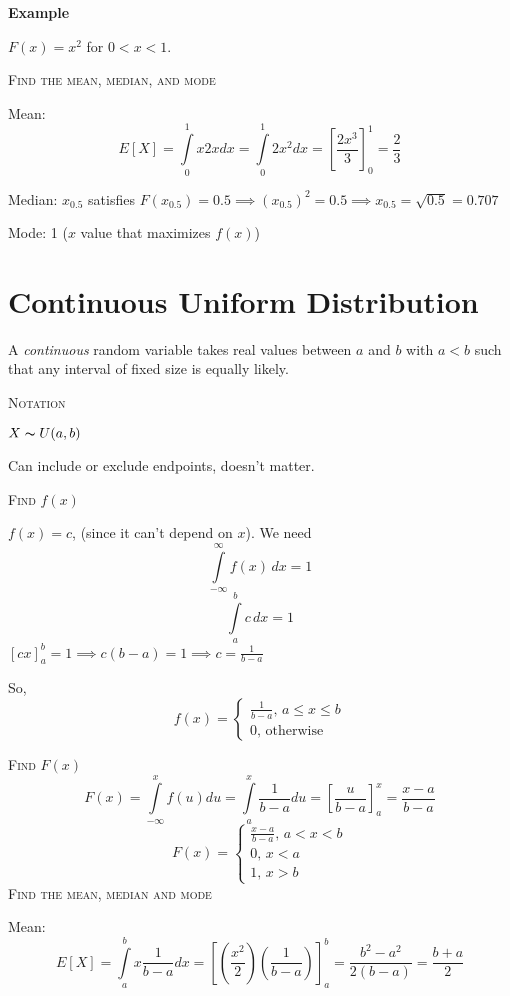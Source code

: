 \textbf{Example}

$ F(x)=x^2 $ for $ 0<x<1 $.

\textsc{Find the mean, median, and mode}

Mean:
\[ E[X]=\int\limits_{0}^{1} x2x d{x} =\int\limits_{0}^{1} 2x^2 d{x}=
    \left[\frac{2x^3}{3}\right]_0^1=\frac{2}{3} \]

Median:
$ x_{0.5} $ satisfies $ F(x_{0.5})=0.5 \implies (x_{0.5})^2=0.5\implies x_{0.5}=
    \sqrt{0.5}=0.707$

Mode: 1 ($ x $ value that maximizes $ f(x) $)

\section{Continuous Uniform Distribution}
A \emph{continuous} random variable takes real values between $ a $ and
$ b $ with $ a<b $ such that any interval of fixed size is equally likely.

\textsc{Notation}

$ X \thicksim U(a,b) $
\begin{remark}
    Can include or exclude endpoints, doesn't matter.
\end{remark}

\textsc{Find $f(x)$}

$ f(x)=c $, (since it can't depend on $ x $). We need
\[ \int\limits_{-\infty}^{\infty} f(x)\,d{x} =1 \]
\[ \int\limits_{a}^{b} c\,d{x} =1 \]
$ \left[cx\right]_a^b=1\implies c(b-a)=1\implies c=\frac{1}{b-a} $

So,
\[ f(x)=\begin{cases}
        \frac{1}{b-a},\, a\le x\le b \\
        0,\, \text{otherwise}
    \end{cases} \]

\textsc{Find $ F(x) $}
\[ F(x)=\int\limits_{-\infty}^{x} f(u) d{u}
    =\int\limits_{a}^{x} \frac{1}{b-a} d{u}
    =\left[\frac{u}{b-a}\right]_a^x=\frac{x-a}{b-a} \]
\[ F(x)=\begin{cases}
        \frac{x-a}{b-a},\, a<x<b \\
        0,\,x<a                  \\
        1,\,x>b
    \end{cases} \]
\textsc{Find the mean, median and mode}

Mean:
\[ E[X]=\int\limits_{a}^{b} x \frac{1}{b-a} d{x}
    =\left[\left(\frac{x^2}{2}\right)\left(\frac{1}{b-a}\right)\right]_a^b
    =\frac{b^2-a^2}{2(b-a)}=\frac{b+a}{2} \]

